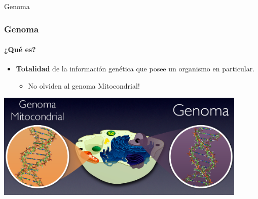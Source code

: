 
\begin{frame}
\begin{center}
	\Huge{Genoma}
\end{center}
\end{frame}


\begin{frame}
\frametitle{Genoma}
\framesubtitle{¿Qué es?}
\begin{itemize}
    \item \textbf{Totalidad} de la información genética que posee un organismo en
		particular.
    \begin{itemize}
        \item No olviden al genoma Mitocondrial!
    \end{itemize}
\end{itemize}
\begin{center}
	\includegraphics[width=0.9\textwidth]{img/genomas}
\end{center}
\end{frame}


